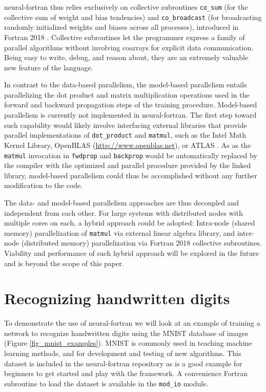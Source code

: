 \documentclass[sigplan, review=false, screen=true, balance=true]{acmart}
\begin{document}
neural-fortran thus relies exclusively on collective subroutines
\lstinline{co_sum} (for the collective sum of weight and bias tendencies) and
\lstinline{co_broadcast} (for broadcasting randomly initialized weights and biases
across all processes), introduced in Fortran 2018 \citep{reid18}.
Collective subroutines let the programmer express a family of parallel
algorithms without involving coarrays for explicit data communication.
Being easy to write, debug, and reason about, they are an extremely valuable
new feature of the language.

In contrast to the data-based parallelism, the model-based parallelism entails
parallelizing the dot product and matrix multiplication operations used in
the forward and backward propagation steps of the training procedure.
Model-based parallelism is currently not implemented in neural-fortran.
The first step toward such capability would likely involve interfacing
external libraries that provide parallel implementations of
\lstinline{dot_product} and \lstinline{matmul}, such as the Intel Math Kernel
Library, OpenBLAS (\url{http://www.openblas.net}), or ATLAS \citep{whaley01, whaley04}.
As as the \lstinline{matmul} invocation in \lstinline{fwdprop} and
\lstinline{backprop} would be automatically replaced by the compiler with the
optimized and parallel procedure provided by the linked library, model-based
parallelism could thus be accomplished without any further modification to
the code.

The data- and model-based parallelism approaches are thus decoupled and
independent from each other. For large systems with distributed nodes with
multiple cores on each, a hybrid approach could be adopted: Intra-node (shared memory)
parallelization of \lstinline{matmul} via external linear algebra library,
and inter-node (distributed memory) parallelization via Fortran 2018 collective
subroutines. Viability and performance of such hybrid approach will be explored
in the future and is beyond the scope of this paper.

\section{Recognizing handwritten digits} \label{section_examples}

To demonstrate the use of neural-fortran we will look at an example of training
a network to recognize handwritten digits using the MNIST database of images
\citep{lecun98} (Figure \ref{fig_mnist_examples}). MNIST is commonly used in
teaching machine learning methods, and for development and testing of new algorithms.
This dataset is included in the neural-fortran repository as is a good example
for beginners to get started and play with the framework.
A convenience Fortran subroutine to load the dataset
is available in the \lstinline{mod_io} module.
\end{document}
